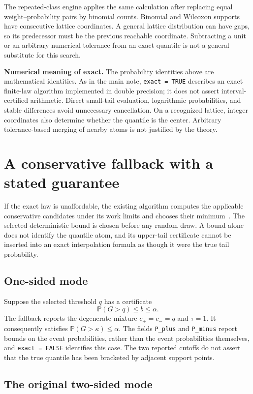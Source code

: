 \documentclass[11pt,letterpaper]{article}
\newcommand{\Pbb}{\mathbb P}
\begin{document}
The repeated-class engine applies the same calculation after replacing
equal weight--probability pairs by binomial counts. Binomial and Wilcoxon
supports have consecutive lattice coordinates. A general lattice
distribution can have gaps, so its predecessor must be the previous
reachable coordinate. Subtracting a unit or an arbitrary numerical tolerance
from an exact quantile is not a general substitute for this search.

\textbf{Numerical meaning of exact.} The probability identities above are
mathematical identities. As in the main note, \texttt{exact = TRUE} describes
an exact finite-law algorithm implemented in double precision; it does not
assert interval-certified arithmetic. Direct small-tail evaluation,
logarithmic probabilities, and stable differences avoid unnecessary
cancellation. On a recognized lattice, integer coordinates also determine
whether the quantile is the center. Arbitrary tolerance-based merging of
nearby atoms is not justified by the theory.

\section{A conservative fallback with a stated guarantee}

If the exact law is unaffordable, the existing algorithm computes the
applicable conservative candidates under its work limits and chooses their
minimum~\cite{mainnote}. The selected deterministic bound is chosen before
any random draw. A bound alone does not identify the quantile atom, and its
upper-tail certificate cannot be inserted into an exact interpolation
formula as though it were the true tail probability.

\subsection*{One-sided mode}

Suppose the selected threshold $q$ has a certificate
\[
\Pbb(G>q)\le b\le\alpha.
\]
The fallback reports the degenerate mixture
$c_+=c_-=q$ and $\tau=1$. It consequently satisfies
$\Pbb(G>\kappa)\le\alpha$. The fields \texttt{P\_plus} and
\texttt{P\_minus} report bounds on the event probabilities, rather than
the event probabilities themselves, and \texttt{exact = FALSE} identifies
this case. The two reported cutoffs do not assert that the true quantile has
been bracketed by adjacent support points.

\subsection*{The original two-sided mode}
\end{document}

